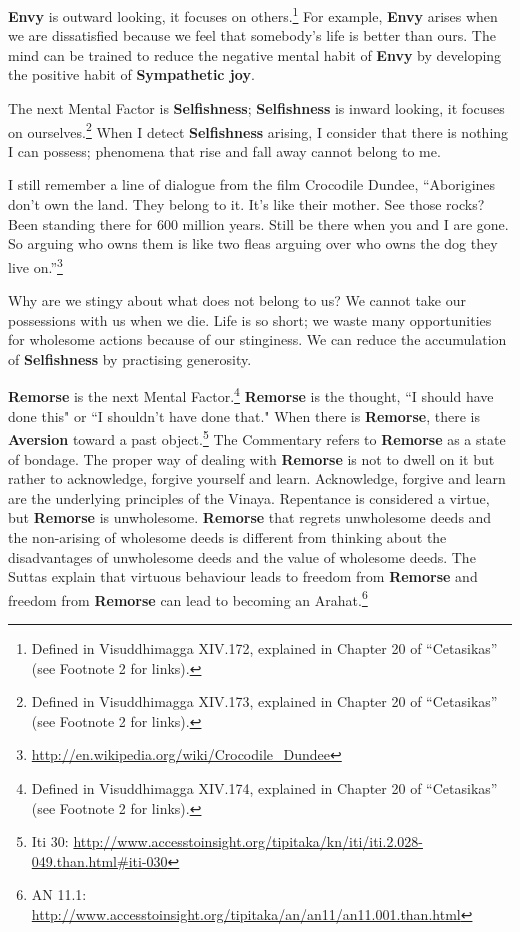 \textbf{Envy} is outward looking, it focuses on others.\footnote{Defined in Visuddhimagga XIV.172, explained in Chapter 20 of “Cetasikas” (see Footnote 2 for links).} For example, \textbf{Envy} arises when we are dissatisfied because we feel that somebody’s life is better than ours. The mind can be trained to reduce the negative mental habit of \textbf{Envy} by developing the positive habit of \textbf{Sympathetic joy}.

The next Mental Factor is \textbf{Selfishness}; \textbf{Selfishness} is inward looking, it focuses on ourselves.\footnote{Defined in Visuddhimagga XIV.173, explained in Chapter 20 of “Cetasikas” (see Footnote 2 for links).} When I detect \textbf{Selfishness} arising, I consider that there is nothing I can possess; phenomena that rise and fall away cannot belong to me.

I still remember a line of dialogue from the film Crocodile Dundee, “Aborigines don’t own the land. They belong to it. It’s like their mother. See those rocks? Been standing there for 600 million years. Still be there when you and I are gone. So arguing who owns them is like two fleas arguing over who owns the dog they live on.”\footnote{\url{http://en.wikipedia.org/wiki/Crocodile_Dundee}}

Why are we stingy about what does not belong to us? We cannot take our possessions with us when we die. Life is so short; we waste many opportunities for wholesome actions because of our stinginess. We can reduce the accumulation of \textbf{Selfishness} by practising generosity.

\textbf{Remorse} is the next Mental Factor.\footnote{Defined in Visuddhimagga XIV.174, explained in Chapter 20 of “Cetasikas” (see Footnote 2 for links).} \textbf{Remorse} is the thought, ``I should have done this" or ``I shouldn't have done that." When there is \textbf{Remorse}, there is \textbf{Aversion} toward a past object.\footnote{Iti 30: \url{http://www.accesstoinsight.org/tipitaka/kn/iti/iti.2.028-049.than.html\#iti-030}} The Commentary refers to \textbf{Remorse} as a state of bondage. The proper way of dealing with \textbf{Remorse} is not to dwell on it but rather to acknowledge, forgive yourself and learn. Acknowledge, forgive and learn are the underlying principles of the Vinaya. Repentance is considered a virtue, but \textbf{Remorse} is unwholesome. \textbf{Remorse} that regrets unwholesome deeds and the non-arising of wholesome deeds is different from thinking about the disadvantages of unwholesome deeds and the value of wholesome deeds. The Suttas explain that virtuous behaviour leads to freedom from \textbf{Remorse} and freedom from \textbf{Remorse} can lead to becoming an Arahat.\footnote{AN 11.1: \url{http://www.accesstoinsight.org/tipitaka/an/an11/an11.001.than.html}}

